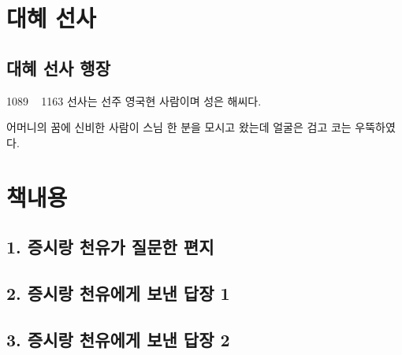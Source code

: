 \documentclass[12pt, a4paper, oneside]{book}
\let\stdsection\section
\renewcommand\section{\newpage\stdsection}
\begin{document}
	\chapter{대혜 선사}
	\noptcrule

	\newpage	
	\minitoc

%
	\section{대혜 선사 행장 }

1089 ~ 1163 선사는 선주 영국현 사람이며 성은 해씨다.

어머니의 꿈에 신비한 사람이 스님 한 분을 모시고 왔는데 얼굴은 검고 코는 우뚝하였다.




	\chapter{책내용 }
	\noptcrule

	\newpage	
	\minitoc


%
	\section{1. 증시랑 천유가 질문한 편지}
%
	\section{2. 증시랑 천유에게 보낸 답장 1 }

%
	\section{3. 증시랑 천유에게 보낸 답장 2 }
\end{document}
